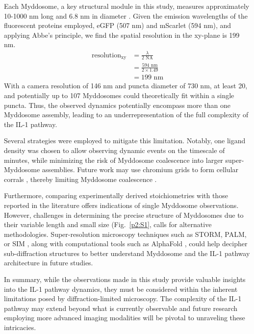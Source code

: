 Each Myddosome, a key structural module in this study, measures approximately 10-1000 nm long and 6.8 nm in diameter \autocite{Moncrieffe_2020}. Given the emission wavelengths of the fluorescent proteins employed, eGFP (507 nm) and mScarlet (594 nm), and applying Abbe's principle, we find the spatial resolution in the xy-plane is 199 nm.
\begin{equation*}
\begin{aligned}
\text{resolution}_\text{xy} &= \frac{\lambda}{2\text{ NA}} \\
&= \frac{594 \text{ nm}}{2 \times 1.49} \\
&= 199 \text{ nm}
\end{aligned}
\end{equation*}
With a camera resolution of 146 nm and puncta diameter of 730 nm, at least 20, and potentially up to 107 Myddosomes could theoretically fit within a single puncta. Thus, the observed dynamics potentially encompass more than one Myddosome assembly, leading to an underrepresentation of the full complexity of the IL-1 pathway.

Several strategies were employed to mitigate this limitation. Notably, one ligand density was chosen to allow observing dynamic events on the timescale of minutes, while minimizing the risk of Myddosome coalescence into larger super-Myddosome assemblies. Future work may use chromium grids to form cellular corrals \autocite{Huang_2019} , thereby limiting Myddosome coalescence \autocite{Cao_2023}.

Furthermore, comparing experimentally derived stoichiometries with those reported in the literature \autocite{Lin_2010}\autocite{Moncrieffe_2020}\autocite{Ye_2002} offers indications of single Myddosome observations. However, challenges in determining the precise structure of Myddosomes due to their variable length and small size (Fig.~\ref{p2:S1}, \autocite{Moncrieffe_2020} calls for alternative methodologies. Super-resolution microscopy techniques such as STORM, PALM, or SIM \autocite{Huang_2010}, along with computational tools such as AlphaFold \autocite{Nussinov_2022}, could help decipher sub-diffraction structures to better understand Myddosome and the IL-1 pathway architecture in future studies.

In summary, while the observations made in this study provide valuable insights into the IL-1 pathway dynamics, they must be considered within the inherent limitations posed by diffraction-limited microscopy. The complexity of the IL-1 pathway may extend beyond what is currently observable and future research employing more advanced imaging modalities will be pivotal to unraveling these intricacies.


